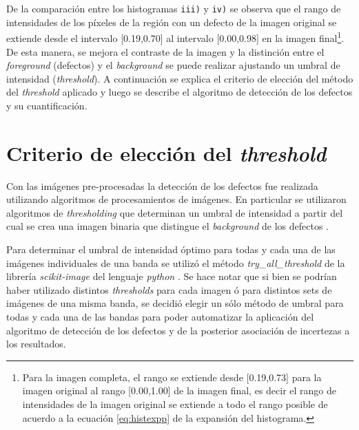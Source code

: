 De la comparación entre los histogramas \texttt{iii)} y \texttt{iv)} se observa que el rango de intensidades de los píxeles de la región con un defecto de la imagen original se extiende desde el intervalo [0.19,0.70] al intervalo [0.00,0.98] en la imagen final\footnote{Para la imagen completa, el rango se extiende desde [0.19,0.73] para la imagen original al rango [0.00,1.00] de la imagen final, es decir el rango de intensidades de la imagen original se extiende a todo el rango posible de acuerdo a la ecuación \ref{eq:histexpp} de la expansión del histograma.}. De esta manera, se mejora el contraste de la imagen y la distinción entre el \textit{foreground} (defectos) y el \textit{background} se puede realizar ajustando un umbral de intensidad  (\textit{threshold}). A continuación se explica el criterio de elección del método del \textit{threshold} aplicado y luego se describe el algoritmo de detección de los defectos y su cuantificación.

\singlespacing
\section{Criterio de elección del \textit{threshold} \href{https://github.com/jrr1984/defects_analysis/blob/master/MAIN/try_all_thresholds.py}{\faGithub}}

\hspace{0.5cm}Con las imágenes pre-procesadas la detección de los defectos fue realizada utilizando algoritmos de procesamientos de imágenes. En particular se utilizaron algoritmos de \textit{thresholding} que determinan un umbral de intensidad a partir del cual se crea una imagen binaria que distingue el \textit{background} de los defectos \cite{shapi}.

Para determinar el umbral de intensidad óptimo para todas y cada una de las imágenes individuales de una banda se utilizó el método \textit{try\_all\_threshold} de la librería \textit{scikit-image} del lenguaje \textit{python} \cite{van2014scikit}. Se hace notar que si bien se podrían haber utilizado distintos \textit{thresholds} para cada imagen ó para distintos sets de imágenes de una misma banda, se decidió elegir un sólo método de umbral para todas y cada una de las bandas para poder automatizar la aplicación del algoritmo de detección de los defectos y de la posterior asociación de incertezas a los resultados.

